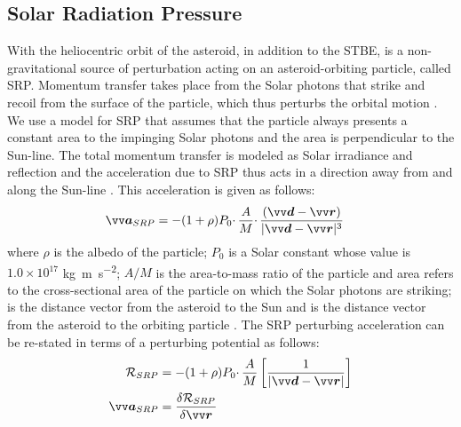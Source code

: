 \subsection{Solar Radiation Pressure}
\label{subsec:srp}
With the heliocentric orbit of the asteroid, in addition to the \gls{STBE}, is a non-gravitational source of perturbation acting on an asteroid-orbiting particle, called \gls{SRP}. Momentum transfer takes place from the Solar photons that strike and recoil from the surface of the particle, which thus perturbs the orbital motion \parencite{scheeresBook}.
%
\newline\newline
%
We use a model for \gls{SRP} that assumes that the particle always presents a constant area to the impinging Solar photons and the area is perpendicular to the Sun-line. The total momentum transfer is modeled as Solar irradiance and reflection and the acceleration due to \gls{SRP} thus acts in a direction away from and along the Sun-line \parencite{scheeresBook}. This acceleration is given as follows:
\begin{align}
    \bv{a}_{SRP} &= -(1 + \rho) P_0 \cdotp \frac{A}{M} \cdotp \frac{(\bv{d} - \bv{r})}{|\bv{d} - \bv{r}|^3}
    \label{eqn:srp_acc}
\end{align}
where $\rho$ is the albedo of the particle; $P_0$ is a Solar constant whose value is $1.0\times10^{17}$ \si{\kilogram \metre \per \second \squared}; $A/M$ is the area-to-mass ratio of the particle and area refers to the cross-sectional area of the particle on which the Solar photons are striking;  is the distance vector from the asteroid to the Sun and  is the distance vector from the asteroid to the orbiting particle \parencite{scheeresBook}. The \gls{SRP} perturbing acceleration can be re-stated in terms of a perturbing potential as follows:
\begin{align}
    \mathcal{R}_{SRP} &= -(1 + \rho) P_0 \cdotp \frac{A}{M} \left[\frac{1}{|\bv{d}-\bv{r}|}\right]
    \label{eqn:srp_potential} \\
    \bv{a}_{SRP} &= \frac{\delta \mathcal{R}_{SRP}}{\delta \bv{r}}
\end{align}

